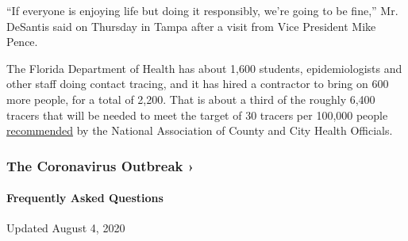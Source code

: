 ``If everyone is enjoying life but doing it responsibly, we're going to
be fine,'' Mr. DeSantis said on Thursday in Tampa after a visit from
Vice President Mike Pence.

The Florida Department of Health has about 1,600 students,
epidemiologists and other staff doing contact tracing, and it has hired
a contractor to bring on 600 more people, for a total of 2,200. That is
about a third of the roughly 6,400 tracers that will be needed to meet
the target of 30 tracers per 100,000 people
\href{https://www.naccho.org/uploads/full-width-images/Contact-Tracing-Statement-4-16-2020.pdf}{recommended}
by the National Association of County and City Health Officials.

\href{https://www.nytimes3xbfgragh.onion/news-event/coronavirus?action=click\&pgtype=Article\&state=default\&region=MAIN_CONTENT_3\&context=storylines_faq}{}

\hypertarget{the-coronavirus-outbreak-}{%
\subsubsection{The Coronavirus Outbreak
›}\label{the-coronavirus-outbreak-}}

\hypertarget{frequently-asked-questions}{%
\paragraph{Frequently Asked
Questions}\label{frequently-asked-questions}}

Updated August 4, 2020

